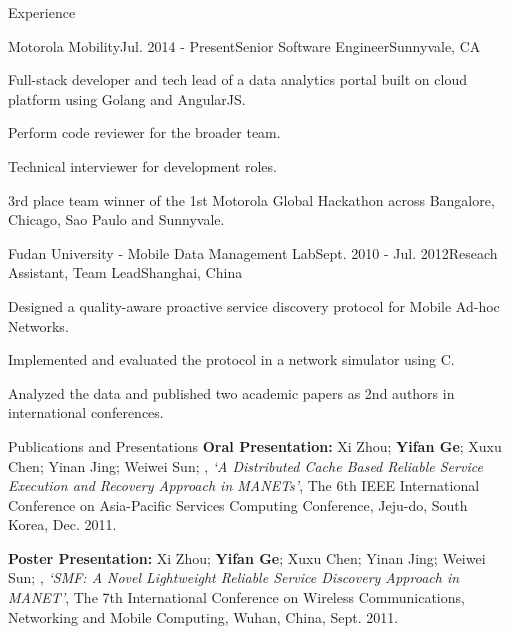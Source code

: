 \documentclass{resume} %
\begin{document}
\begin{rSection}{Experience}

\begin{rSubsection}{Motorola Mobility}{Jul. 2014 - Present}{Senior Software Engineer}{Sunnyvale, CA}
\item Full-stack developer and tech lead of a data analytics portal built on cloud platform using Golang and AngularJS.
\item Perform code reviewer for the broader team.
\item Technical interviewer for development roles.
\item 3rd place team winner of the 1st Motorola Global Hackathon across Bangalore, Chicago, Sao Paulo and Sunnyvale.
\end{rSubsection}


\begin{rSubsection}{Fudan University - Mobile Data Management Lab}{Sept. 2010 - Jul. 2012}{Reseach Assistant, Team Lead}{Shanghai, China}
\item Designed a quality-aware proactive service discovery protocol for Mobile Ad-hoc Networks.
\item Implemented and evaluated the protocol in a network simulator using C.
\item Analyzed the data and published two academic papers as 2nd authors in international conferences.
\end{rSubsection}

\end{rSection}


\begin{rSection}{Publications and Presentations}
{\bf Oral Presentation:} Xi Zhou; {\bf Yifan Ge}; Xuxu Chen; Yinan Jing; Weiwei Sun; , {\em `A Distributed Cache Based Reliable Service Execution and Recovery Approach in MANETs'}, The 6th IEEE International Conference on Asia-Pacific Services Computing Conference, Jeju-do, South Korea, Dec. 2011.

{\bf Poster Presentation:} Xi Zhou; {\bf Yifan Ge}; Xuxu Chen; Yinan Jing; Weiwei Sun; , {\em `SMF: A Novel Lightweight Reliable Service Discovery Approach in MANET'}, The 7th International Conference on Wireless Communications, Networking and Mobile Computing, Wuhan, China, Sept. 2011.
\end{rSection}
\end{document}
